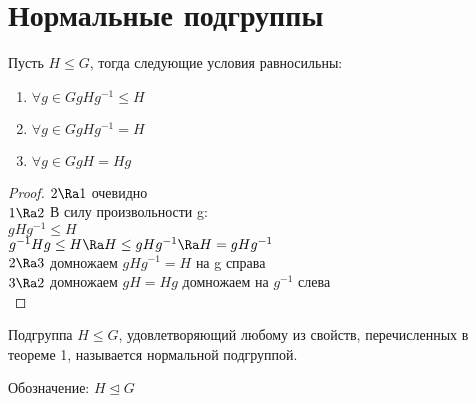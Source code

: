 \section{Нормальные подгруппы}
\begin{theorem}
 Пусть $H \le G$, тогда следующие условия равносильны:
 \begin{enumerate}
 \item $\forall g \in G gHg^{-1} \le H$\\
 \item $\forall g \in G gHg^{-1} = H$ \\
 \item $\forall g \in G gH = Hg$\\
 \end{enumerate}
\end{theorem}   
\begin{proof}
$2 \Ra 1$ очевидно\\
$1 \Ra 2$ В силу произвольности g:\\
$gHg^{-1} \le H$\\
$g^{-1}Hg \le H \Ra H \le gHg^{-1} \Ra H = gHg^{-1}$\\
$2 \Ra 3$ домножаем $gHg^{-1} = H$ на g справа\\
$3 \Ra 2$ домножаем $gH = Hg$ домножаем на $g^{-1}$ слева\\
\end{proof}

\begin{Def}
Подгруппа $H \le G$, удовлетворяющий любому из свойств, 
перечисленных в теореме 1, называется нормальной подгруппой.

Обозначение: $H \unlhd G$\\
\end{Def}

